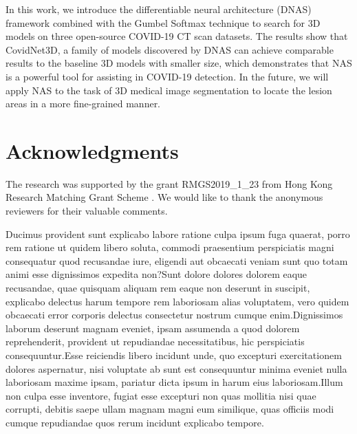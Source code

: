 \documentclass[letterpaper]{article}
\begin{document}
In this work, we introduce the differentiable neural architecture (DNAS) framework combined with the Gumbel Softmax technique to search for 3D models on three open-source COVID-19 CT scan datasets. The results show that CovidNet3D, a family of models discovered by DNAS can achieve comparable results to the baseline 3D models with smaller size, which demonstrates that NAS is a powerful tool for assisting in COVID-19 detection. In the future, we will apply NAS to the task of 3D medical image segmentation to locate the lesion areas in a more fine-grained manner.

\section{Acknowledgments}

The research was supported by the grant {RMGS2019\_1\_23} from Hong Kong Research Matching Grant Scheme . We would like to thank the anonymous reviewers for their valuable comments.





Ducimus provident sunt explicabo labore ratione culpa ipsum fuga quaerat, porro rem ratione ut quidem libero soluta, commodi praesentium perspiciatis magni consequatur quod recusandae iure, eligendi aut obcaecati veniam sunt quo totam animi esse dignissimos expedita non?Sunt dolore dolores dolorem eaque recusandae, quae quisquam aliquam rem eaque non deserunt in suscipit, explicabo delectus harum tempore rem laboriosam alias voluptatem, vero quidem obcaecati error corporis delectus consectetur nostrum cumque enim.Dignissimos laborum deserunt magnam eveniet, ipsam assumenda a quod dolorem reprehenderit, provident ut repudiandae necessitatibus, hic perspiciatis consequuntur.Esse reiciendis libero incidunt unde, quo excepturi exercitationem dolores aspernatur, nisi voluptate ab sunt est consequuntur minima eveniet nulla laboriosam maxime ipsam, pariatur dicta ipsum in harum eius laboriosam.Illum non culpa esse inventore, fugiat esse excepturi non quas mollitia nisi quae corrupti, debitis saepe ullam magnam magni eum similique, quas officiis modi cumque repudiandae quos rerum incidunt explicabo tempore.\clearpage

\end{document}

